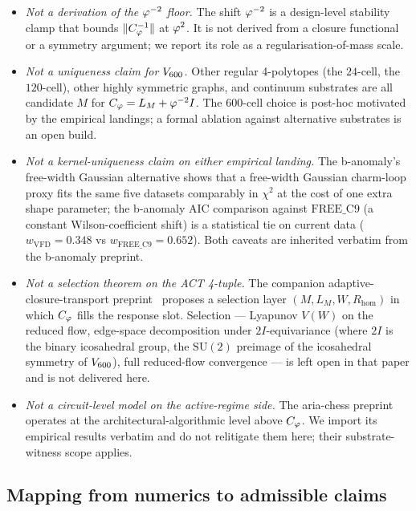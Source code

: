 \begin{itemize}\itemsep=2pt
\item \emph{Not a derivation of the $\varphi^{-2}$ floor.} The shift
  $\varphi^{-2}$ is a design-level stability clamp that bounds
  $\|C_{\varphi}^{-1}\|$ at $\varphi^{2}$. It is not derived from a closure
  functional or a symmetry argument; we report its role as a
  regularisation-of-mass scale.
\item \emph{Not a uniqueness claim for $V_{600}$.} Other
  regular 4-polytopes (the $24$-cell, the $120$-cell), other
  highly symmetric graphs, and continuum substrates are all
  candidate $M$ for $C_{\varphi} = L_M + \varphi^{-2} I$. The 600-cell choice
  is post-hoc motivated by the empirical landings; a formal
  ablation against alternative substrates is an open build.
\item \emph{Not a kernel-uniqueness claim on either empirical
  landing.} The b-anomaly's free-width Gaussian alternative shows
  that a free-width Gaussian charm-loop proxy fits the same five
  datasets comparably in $\chi^{2}$ at the cost of one extra shape
  parameter; the b-anomaly AIC comparison against
  $\mathrm{FREE\_C9}$ (a constant Wilson-coefficient shift) is a
  statistical tie on current data
  ($w_{\mathrm{VFD}}=0.348$ vs $w_{\mathrm{FREE\_C9}}=0.652$).
  Both caveats are inherited verbatim from the b-anomaly preprint.
\item \emph{Not a selection theorem on the
  ACT 4-tuple.} The companion adaptive-closure-transport
  preprint~\citep{SmartAdaptiveClosureTransport2026} proposes a
  selection layer $(M, L_M, W, R_{\mathrm{hom}})$ in which $C_{\varphi}$
  fills the response slot. Selection — Lyapunov $V(W)$ on the
  reduced flow, edge-space decomposition under $2I$-equivariance
  (where $2I$ is the binary icosahedral group, the $\mathrm{SU}(2)$
  preimage of the icosahedral symmetry of $V_{600}$),
  full reduced-flow convergence — is left open in that paper and
  is not delivered here.
\item \emph{Not a circuit-level model on the active-regime side.}
  The aria-chess preprint operates at the architectural-algorithmic
  level above $C_{\varphi}$. We import its empirical results verbatim and
  do not relitigate them here; their substrate-witness scope
  applies.
\end{itemize}

\subsection*{Mapping from numerics to admissible claims}

